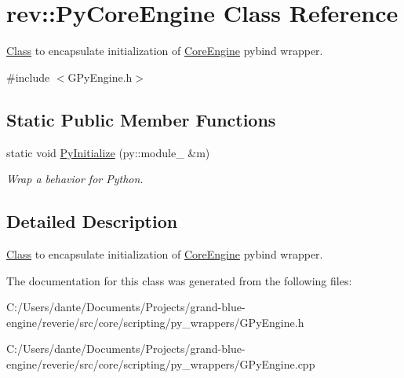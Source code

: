 \hypertarget{classrev_1_1_py_core_engine}{}\section{rev\+::Py\+Core\+Engine Class Reference}
\label{classrev_1_1_py_core_engine}


\mbox{\hyperlink{struct_class}{Class}} to encapsulate initialization of \mbox{\hyperlink{classrev_1_1_core_engine}{Core\+Engine}} pybind wrapper.  




{\ttfamily \#include $<$G\+Py\+Engine.\+h$>$}

\subsection*{Static Public Member Functions}
\begin{DoxyCompactItemize}
\item 
\mbox{\label{classrev_1_1_py_core_engine_ae540108a00f050bb4df7a2421d40a1f1}} 
static void \mbox{\hyperlink{classrev_1_1_py_core_engine_ae540108a00f050bb4df7a2421d40a1f1}{Py\+Initialize}} (py\+::module\+\_\+ \&m)
\begin{DoxyCompactList}\small\item\em Wrap a behavior for Python. \end{DoxyCompactList}\end{DoxyCompactItemize}


\subsection{Detailed Description}
\mbox{\hyperlink{struct_class}{Class}} to encapsulate initialization of \mbox{\hyperlink{classrev_1_1_core_engine}{Core\+Engine}} pybind wrapper. 

The documentation for this class was generated from the following files\+:\begin{DoxyCompactItemize}
\item 
C\+:/\+Users/dante/\+Documents/\+Projects/grand-\/blue-\/engine/reverie/src/core/scripting/py\+\_\+wrappers/G\+Py\+Engine.\+h\item 
C\+:/\+Users/dante/\+Documents/\+Projects/grand-\/blue-\/engine/reverie/src/core/scripting/py\+\_\+wrappers/G\+Py\+Engine.\+cpp\end{DoxyCompactItemize}
